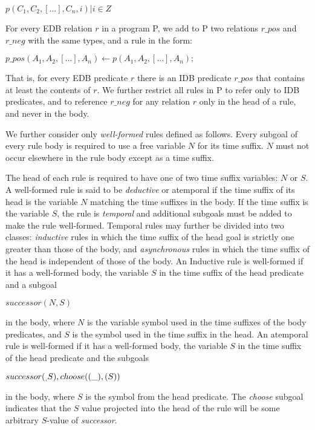 \documentclass{acm_proc_article-sp-sigmod09}
\begin{document}
$p(C_{1},C_{2},[...],C_{n}, i) |  i \in Z$

For every EDB relation $r$ in a program P, we add to P two relations $r\_pos$ and $r\_neg$ with the same types, and a rule in the form:

$p\_pos(A_1, A_2, [...], A_n) \leftarrow p(A_1, A_2, [...], A_n);$

That is, for every EDB predicate $r$ there is an IDB predicate $r\_pos$ that contains at least the contents of $r$.
We further restrict all rules in P to refer only to IDB predicates, and to reference $r\_neg$ for any relation $r$ only 
in the head of a rule, and never in the body.  

We further consider only \emph{well-formed} rules defined as follows.  Every subgoal of every rule body is 
required to use a free variable $N$ for its time suffix.  $N$ must not occur elsewhere in the rule body
except as a time suffix.

The head of each rule is required to have one of two time suffix variables: $N$ or $S$.  A well-formed rule is said to be \emph{deductive} or atemporal
if the time suffix of its head is the variable $N$ matching the time suffixes in the body.  If the time suffix is the variable $S$, the rule is
\emph{temporal} and additional subgoals must be added to make the rule well-formed.  Temporal rules may further be divided into two
classes: \emph{inductive} rules in which the time suffix of the head goal is strictly one greater than those of the body, and \emph{asynchronous}
rules in which the time suffix of the head is independent of those of the body.  An Inductive rule is well-formed if it has a well-formed body, 
the variable $S$ in the time suffix of the head predicate and a subgoal 

$successor(N, S)$

in the body, where $N$ is the variable symbol used in the time suffixes of the body predicates, and $S$ is the symbol used in the time suffix
in the head.  An atemporal rule is well-formed if it has a well-formed body, the variable $S$ in the time suffix of the head predicate and the subgoals

$successor(_, S), \\
choose((\_), (S))$

in the body, where $S$ is the symbol from the head predicate.  The \emph{choose} subgoal indicates that the $S$ value projected
into the head of the rule will be some arbitrary $S$-value of \emph{successor}.


\subsection{}
\end{document}
